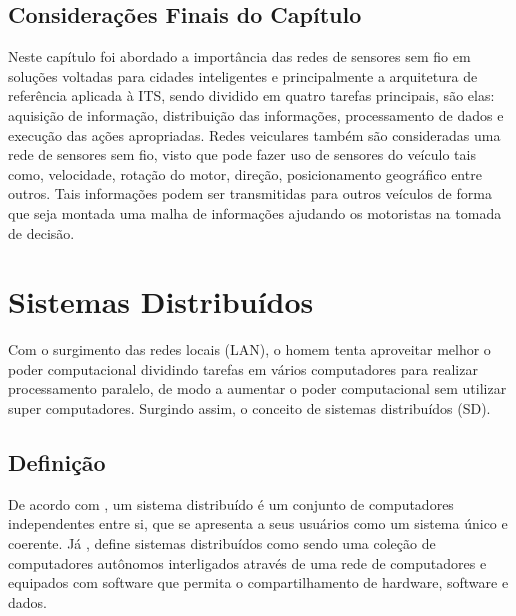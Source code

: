 \documentclass[
	12pt,				%
	oneside,			%
	a4paper,			%
	english,			%
	brazil				%
	]{abntex2ppgsi}
\begin{document}

\section{Considerações Finais do Capítulo}

Neste capítulo foi abordado a importância das redes de sensores sem fio em soluções voltadas para cidades inteligentes e principalmente  a arquitetura de referência aplicada à ITS, sendo dividido em quatro tarefas principais, são elas: aquisição de informação, distribuição das informações,  processamento de dados e execução das ações apropriadas. Redes veiculares também são consideradas uma rede de sensores sem fio, visto que pode fazer uso de sensores do veículo tais como, velocidade, rotação do motor, direção, posicionamento geográfico entre outros. Tais informações podem ser transmitidas para outros veículos de forma que seja montada uma malha de informações ajudando os motoristas na tomada de decisão.

\chapter{Sistemas Distribuídos}

Com o surgimento das redes locais (LAN), o homem tenta aproveitar melhor o poder computacional dividindo tarefas em vários computadores para realizar processamento paralelo, de modo a aumentar o poder computacional sem utilizar super computadores. Surgindo assim, o conceito de sistemas distribuídos (SD).

\section{Definição}

De acordo com , um sistema distribuído é um conjunto de computadores independentes entre si, que se apresenta a seus usuários como um sistema único e coerente. Já  , define sistemas distribuídos como sendo uma coleção de computadores autônomos interligados através de uma rede de computadores e equipados com software que permita o compartilhamento de hardware, software e dados.
\end{document}
